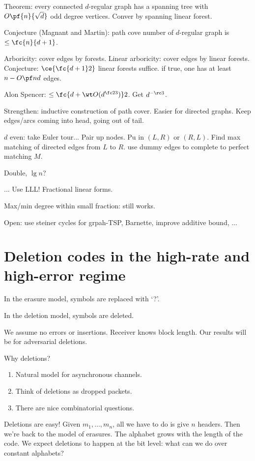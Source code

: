 Theorem: every connected $d$-regular graph has a spanning tree with $O\pf{n}{\sqrt d}$ odd degree vertices.
Conver by spanning linear forest. 

Conjecture (Magnant and Martin): path cove number of $d$-regular graph is $\le \fc{n}{d+1}$.

Arboricity: cover edges by forests. Linear arboricity: cover edges by linear forests. Conjecture: $\ce{\fc{d+1}2}$ linear forests suffice. if true, one has at least $n-O\pf nd$ edges.

Alon Spencer: $\le \fc{d+\wt O(d^{\fc 23})}2$. Get $d^{-\rc3}$. 

Strengthen: inductive construction of path cover. Easier for directed graphs. Keep edges/arcs coming into head, going out of tail. 

$d$ even: take Euler tour... Pair up nodes. Pu in $(L,R)$ or $(R,L)$. Find max matching of directed edges from $L$ to $R$. use dummy edges to complete to perfect matching $M$.

Double, $\lg n$?

... Use LLL! Fractional linear forms.

Max/min degree within small fraction: still works.

Open: use steiner cycles for grpah-TSP, Barnette, improve additive bound, ...


\section{Deletion codes in the high-rate and high-error regime}

In the erasure model, symbols are replaced with `?'.

In the deletion model, symbols are deleted.

We assume no errors or insertions.
Receiver knows block length. Our results will be for adversarial deletions. 

Why deletions?
\begin{enumerate}
\item
Natural model for asynchronous channels.
\item
Think of deletions as dropped packets.
\item
There are nice combinatorial questions.
\end{enumerate}

Deletions are easy! Given $m_1,\ldots, m_n$, all we have to do is give $n$ headers. Then we're back to the model of erasures. The alphabet grows with the length of the code. 
We expect deletions to happen at the bit level: what can we do over constant alphabets?

